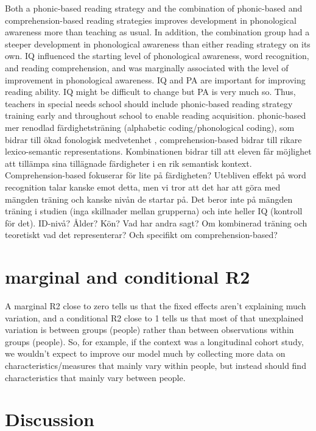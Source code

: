 \documentclass[
]{article}
\begin{document}
Both a phonic-based reading strategy and the combination of phonic-based
and comprehension-based reading strategies improves development in
phonological awareness more than teaching as usual. In addition, the
combination group had a steeper development in phonological awareness
than either reading strategy on its own. IQ influenced the starting
level of phonological awareness, word recognition, and reading
comprehension, and was marginally associated with the level of
improvement in phonological awareness. IQ and PA are important for
improving reading ability. IQ might be difficult to change but PA is
very much so. Thus, teachers in special needs school should include
phonic-based reading strategy training early and throughout school to
enable reading acquisition. phonic-based mer renodlad färdighetsträning
(alphabetic coding/phonological coding), som bidrar till ökad fonologisk
medvetenhet , comprehension-based bidrar till rikare lexico-semantic
representations. Kombinationen bidrar till att eleven får möjlighet att
tillämpa sina tillägnade färdigheter i en rik semantisk kontext.
Comprehension-based fokuserar för lite på färdigheten? Utebliven effekt
på word recognition talar kanske emot detta, men vi tror att det har att
göra med mängden träning och kanske nivån de startar på. Det beror inte
på mängden träning i studien (inga skillnader mellan grupperna) och inte
heller IQ (kontroll för det). ID-nivå? Ålder? Kön? Vad har andra sagt?
Om kombinerad träning och teoretiskt vad det representerar? Och
specifikt om comprehension-based?

\hypertarget{marginal-and-conditional-r2}{%
\section{marginal and conditional
R2}\label{marginal-and-conditional-r2}}

A marginal R2 close to zero tells us that the fixed effects aren't
explaining much variation, and a conditional R2 close to 1 tells us that
most of that unexplained variation is between groups (people) rather
than between observations within groups (people). So, for example, if
the context was a longitudinal cohort study, we wouldn't expect to
improve our model much by collecting more data on
characteristics/measures that mainly vary within people, but instead
should find characteristics that mainly vary between people.

\hypertarget{discussion}{%
\section{Discussion}\label{discussion}}
\end{document}
